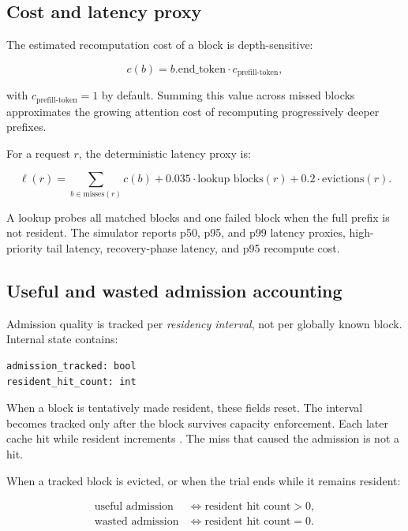 \documentclass[11pt]{article}
\newcommand{\code}[1]{\texttt{\detokenize{#1}}}
\begin{document}
\subsection{Cost and latency proxy}

The estimated recomputation cost of a block is depth-sensitive:

\begin{equation}
  c(b) = b.\text{end\_token}\cdot c_{\text{prefill-token}},
\end{equation}

with \(c_{\text{prefill-token}}=1\) by default.  Summing this value across missed blocks
approximates the growing attention cost of recomputing progressively deeper prefixes.

For a request \(r\), the deterministic latency proxy is:

\begin{equation}
  \ell(r) =
  \sum_{b\in\text{misses}(r)} c(b)
  + 0.035\cdot\text{lookup blocks}(r)
  + 0.2\cdot\text{evictions}(r).
\end{equation}

A lookup probes all matched blocks and one failed block when the full prefix is not
resident.  The simulator reports p50, p95, and p99 latency proxies, high-priority tail
latency, recovery-phase latency, and p95 recompute cost.

\subsection{Useful and wasted admission accounting}
\label{sec:admission-accounting}

Admission quality is tracked per \emph{residency interval}, not per globally known
block.  Internal state contains:

\begin{lstlisting}[style=python]
admission_tracked: bool
resident_hit_count: int
\end{lstlisting}

When a block is tentatively made resident, these fields reset.  The interval becomes
tracked only after the block survives capacity enforcement.  Each later cache hit while
resident increments \code{resident_hit_count}.  The miss that caused the admission is
not a hit.

When a tracked block is evicted, or when the trial ends while it remains resident:

\begin{align}
  \text{useful admission} &\iff \text{resident hit count} > 0,\\
  \text{wasted admission} &\iff \text{resident hit count} = 0.
\end{align}
\end{document}
